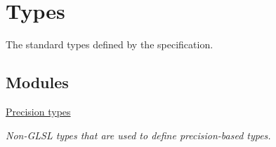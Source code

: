 \hypertarget{group__core__types}{\section{Types}
\label{group__core__types}
}


The standard types defined by the specification.  


\subsection*{Modules}
\begin{DoxyCompactItemize}
\item 
\hyperlink{group__core__precision}{Precision types}
\begin{DoxyCompactList}\small\item\em Non-\/\-G\-L\-S\-L types that are used to define precision-\/based types. \end{DoxyCompactList}\end{DoxyCompactItemize}

